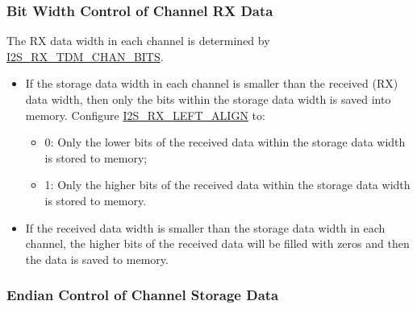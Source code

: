 \documentclass[main\_\_EN.tex]{subfiles}
\begin{document}
\subsubsection{Bit Width Control of Channel RX Data}

The RX data width in each channel is determined by \hyperref[fielddesc:I2SRXTDMCHANBITS]{I2S\_RX\_TDM\_CHAN\_BITS}.
\begin{itemize}
\item If the storage data width in each channel is smaller than the received (RX) data width, then only the bits within the storage data width is saved into memory. Configure \hyperref[fielddesc:I2SRXLEFTALIGN]{I2S\_RX\_LEFT\_ALIGN} to:
\begin{itemize}
\item 0: Only the lower bits of the received data within the storage data width is stored to memory;
\item 1: Only the higher bits of the received data within the storage data width is stored to memory.
\end{itemize}
\item If the received data width is smaller than the storage data width in each channel, the higher bits of the received data will be filled with zeros and then the data is saved to memory.
\end{itemize}

\subsubsection{Endian Control of Channel Storage Data}
\end{document}
